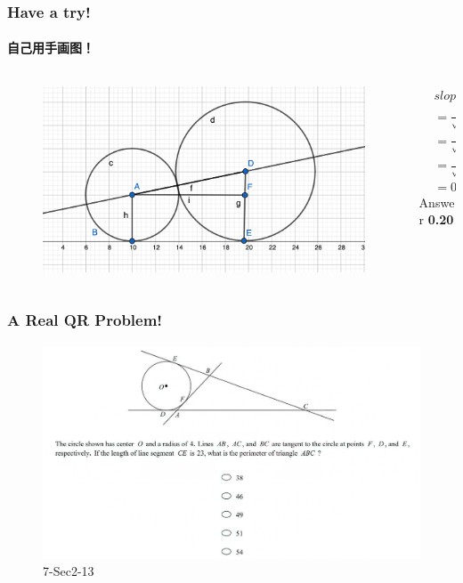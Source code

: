\documentclass[
	11pt, %
]{beamer}
\begin{document}
\begin{frame}
	\frametitle{Have a try!}
	\framesubtitle{自己用手画图！}
\begin{columns}[t] 
	\begin{column}{0.55\textwidth} %
		\begin{figure}
			\includegraphics[width=\linewidth]{Tangent_Example_Question1_1.png}
		\end{figure}	
	\end{column}

	\begin{column}{0.545\textwidth} %
	\pause
	\begin{equation*}
		\begin{aligned}
		&slope=\frac{DF}{AF}\\
		&=\frac{DE - AB}{\sqrt{AD^2 - DF^2}}\\
		&= \frac{6 - 4}{\sqrt{10^2 - 2^2}}\\
		&=\frac{2}{\sqrt{96}}\\
		&=0.20
		\end{aligned}
	\end{equation*}
	\bigskip
	Answer \textbf{0.20}
	\end{column}

\end{columns}
\end{frame}




\begin{frame}
	\frametitle{A Real QR Problem!}
	\framesubtitle{}
	\begin{figure}
		\includegraphics[width=0.8\linewidth]{Tangent_Example_Question2.png}
		\caption{7-Sec2-13}
	\end{figure}
\end{frame}
\end{document}
